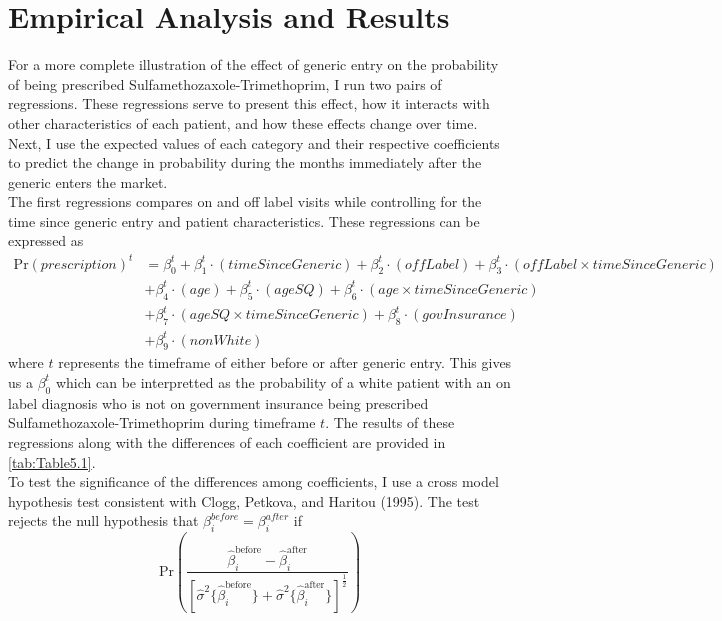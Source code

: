 \chapter{Empirical Analysis and Results}
For a more complete illustration of the effect of generic entry on the probability of being prescribed Sulfamethozaxole-Trimethoprim, I run two pairs of regressions. These regressions serve to present this effect, how it interacts with other characteristics of each patient, and how these effects change over time. Next, I use the expected values of each category and their respective coefficients to predict the change in probability during the months immediately after the generic enters the market. \\
\indent The first regressions compares on and off label visits while controlling for the time since generic entry and patient characteristics. These regressions can be expressed as
\begin{equation}
\begin{split}
    \text{Pr}(prescription)^t & = \beta^t_0 + \beta^t_1\cdot(timeSinceGeneric) + \beta_2^t\cdot(offLabel) + \beta_3^t\cdot(offLabel\times timeSinceGeneric)\\
    & + \beta_4^t\cdot(age) + \beta_5^t\cdot(ageSQ)  + \beta_6^t\cdot(age\times timeSinceGeneric)\\
    & + \beta_7^t\cdot(ageSQ\times timeSinceGeneric)  + \beta_8^t\cdot(govInsurance)\\
    & + \beta_9^t\cdot(nonWhite)
\end{split}
\end{equation}
where $t$ represents the timeframe of either before or after generic entry. This gives us a $\beta_0^t$ which can be interpretted as the probability of a white patient with an on label diagnosis who is not on government insurance being prescribed Sulfamethozaxole-Trimethoprim during timeframe $t$. The results of these regressions along with the differences of each coefficient are provided in \autoref{tab:Table5.1}.\\
\indent To test the significance of the differences among coefficients, I use a cross model hypothesis test consistent with Clogg, Petkova, and Haritou (1995)\cite{clogg_statistical_1995}. The test rejects the null hypothesis that $\beta_i^{before} = \beta_i^{after}$ if 
\begin{equation}
\text{Pr}(\frac{\hat{\beta}^\text{before}_i - \hat{\beta}^\text{after}_i}{[\hat{\sigma}^2\{\hat{\beta}^\text{before}_i\} + \hat{\sigma}^2\{\hat{\beta}^\text{after}_i\}]^\frac{1}{2}})
\end{equation}
